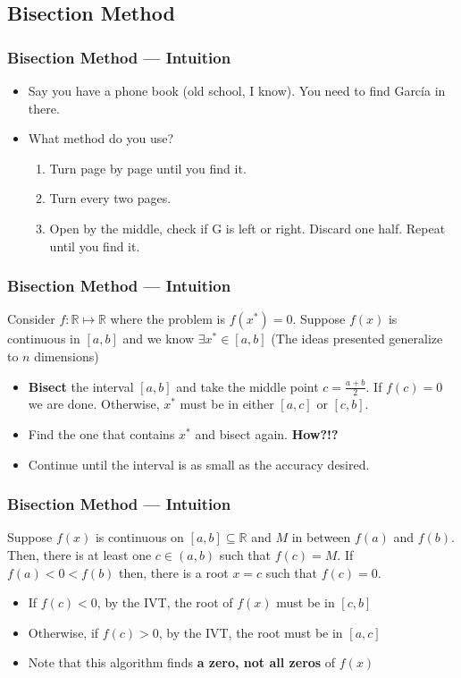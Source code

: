 \documentclass[11pt,xcolor={svgnames},aspectratio=169,usepdftitle=false,notheorems]{beamer}
\begin{document}
\subsection{Bisection Method}

\begin{frame}[c]
  \frametitle{Bisection Method --- Intuition}
 \begin{itemize}
  \item Say you have a phone book (old school, I know). You need to find Garc\'ia in there.
  \item What method do you use?
  \pause
  \begin{enumerate}
    \item Turn page by page until you find it.
    \pause
    \item Turn every two pages. 
    \pause
    \item Open by the middle, check if G is left or right. Discard one half. Repeat until you find it.
  \end{enumerate}
 \end{itemize} 
\end{frame}

\begin{frame}
  \frametitle{Bisection Method --- Intuition}
Consider $f : \mathbb{R} \mapsto \mathbb{R}$ where the problem is $f(x^*) = 0$. Suppose $f(x)$ is continuous in $[a,b]$ and we know $\exists x^*\in[a,b]$ {\tiny (The ideas presented generalize to $n$ dimensions)}

\begin{itemize}
  \item \alert{\textbf{Bisect}} the interval $[a,b]$ and take the middle point $c = \frac{a + b}{2}$. If $f(c) = 0$ we are done. Otherwise, $x^*$ must be in either $[a,c]$ or $[c,b]$.
  \item Find the one that contains $x^*$ and bisect again. \alert{\textbf{How?!?}}
  \item Continue until the interval is as small as the accuracy desired.
\end{itemize}
\end{frame}

\begin{frame}
  \frametitle{Bisection Method --- Intuition}
\begin{theorem}
Suppose $f(x)$ is continuous on $[a,b]\subseteq\mathbb{R}$ and $M$ in between $f(a)$ and $f(b)$. Then, there is at least one $c\in(a,b)$ such that $f(c) = M$. If $f(a) < 0 < f(b)$ then, there is a root $x = c$ such that $f(c) = 0$.
\end{theorem}

\begin{itemize}
  \item If $f(c) < 0$, by the IVT, the root of $f(x)$ must be in $[c,b]$
  \item Otherwise, if $f(c) > 0$, by the IVT, the root must be in $[a,c]$
  \item Note that this algorithm finds \alert{\textbf{a zero, not all zeros}} of $f(x)$
\end{itemize}
\end{frame}
\end{document}
